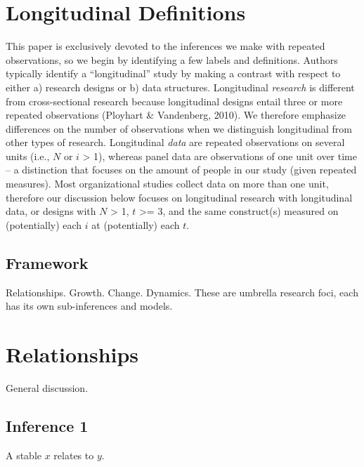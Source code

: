 \documentclass[english,,man]{apa6}
\theoremstyle{definition}
\theoremstyle{definition}
\theoremstyle{definition}
\theoremstyle{remark}
\begin{document}
\hypertarget{longitudinal-definitions}{%
\section{Longitudinal Definitions}\label{longitudinal-definitions}}

This paper is exclusively devoted to the inferences we make with
repeated observations, so we begin by identifying a few labels and
definitions. Authors typically identify a \enquote{longitudinal} study
by making a contrast with respect to either a) research designs or b)
data structures. Longitudinal \emph{research} is different from
cross-sectional research because longitudinal designs entail three or
more repeated observations (Ployhart \& Vandenberg, 2010). We therefore
emphasize differences on the number of observations when we distinguish
longitudinal from other types of research. Longitudinal \emph{data} are
repeated observations on several units (i.e., \(N\) or \(i\)
\textgreater{} 1), whereas panel data are observations of one unit over
time -- a distinction that focuses on the amount of people in our study
(given repeated measures). Most organizational studies collect data on
more than one unit, therefore our discussion below focuses on
longitudinal research with longitudinal data, or designs with \(N\)
\textgreater{} 1, \(t\) \textgreater{}= 3, and the same construct(s)
measured on (potentially) each \(i\) at (potentially) each \(t\).

\hypertarget{framework}{%
\subsection{Framework}\label{framework}}

Relationships. Growth. Change. Dynamics. These are umbrella research
foci, each has its own sub-inferences and models.

\hypertarget{relationships}{%
\section{Relationships}\label{relationships}}

General discussion.

\hypertarget{inference-1}{%
\subsection{Inference 1}\label{inference-1}}

A stable \(x\) relates to \(y\).
\end{document}
